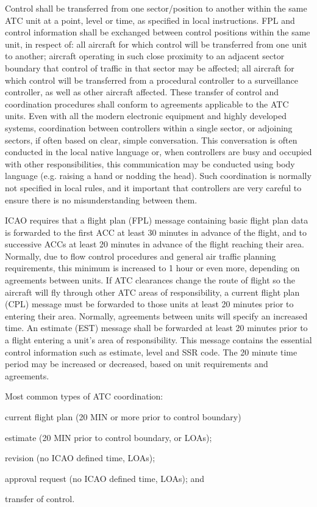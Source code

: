 Control shall be transferred from one sector/position to another within the same ATC unit at a point, level or time, as specified in local instructions.
FPL and control information shall be exchanged between control positions within the same unit, in respect of:
  all aircraft for which control will be transferred from one unit to another;
  aircraft operating in such close proximity to an adjacent sector boundary 	that control of traffic in that sector may be affected;
  all aircraft for which control will be transferred from a procedural controller 	to a surveillance controller, as well as other aircraft affected.
These transfer of control and coordination procedures shall conform to agreements applicable to the ATC units.
Even with all the modern electronic equipment and highly developed systems, coordination between controllers within a single sector, or adjoining sectors, if often based on clear, simple conversation. 
This conversation is often conducted in the local native language or, when controllers are busy and occupied with other responsibilities, this communication may be conducted using body language (e.g. raising a hand or nodding the head). 
Such coordination is normally not specified in local rules, and it important that controllers are very careful to ensure there is no misunderstanding between them.
\cite[Chapter 4.3.5, 10.1.5]{doc4444}

ICAO requires that a flight plan (FPL) message containing basic flight plan data is forwarded to the first ACC at least 30 minutes in advance of the flight, and to successive ACCs at least 20 minutes in advance of the flight reaching their area. Normally, due to flow control procedures and general air traffic planning requirements, this minimum is increased to 1 hour or even more, depending on agreements between units. 
If ATC clearances change the route of flight so the aircraft will fly through other ATC areas of responsibility, a current flight plan (CPL) message must be forwarded to those units at least 20 minutes prior to entering their area. Normally, agreements between units will specify an increased time.
An estimate (EST) message shall be forwarded at least 20 minutes prior to a flight entering a unit’s area of responsibility. This message contains the essential control information such as estimate, level and SSR code. The 20 minute time period may be increased or decreased, based on unit requirements and agreements.
\cite[Chapter 11.3,4]{doc4444}

Most common types of ATC coordination:
\bitem
\item current flight plan (20 MIN or more prior to control boundary) 
\item estimate (20 MIN prior to control boundary, or LOAs); 
\item revision (no ICAO defined time, LOAs);
\item approval request (no ICAO defined time, LOAs); and
\item transfer of control.
\eitem

